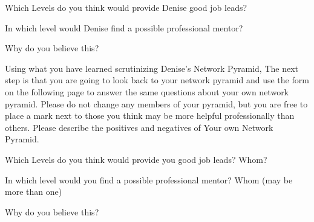 \hrulefill

\hrulefill

\hrulefill

\hrulefill

\hrulefill

\hrulefill

Which Levels do you think would provide Denise good job leads? 

\hrulefill

\hrulefill

In which level would Denise find a possible professional mentor? 

\hrulefill

\hrulefill

Why do you believe this?

\hrulefill

\hrulefill

\hrulefill

\hrulefill

Using what you have learned scrutinizing Denise's Network Pyramid, The next step is that you are going to look back to your network pyramid and use the form on the following page to answer the same questions about your own network pyramid. Please do not change any members of your pyramid, but you are free to place a mark next to those you think may be more helpful professionally than others. 
\clearpage
Please describe the positives and negatives of Your own Network Pyramid. 

\hrulefill

\hrulefill

\hrulefill

\hrulefill

\hrulefill

\hrulefill

Which Levels do you think would provide you good job leads? Whom?

\hrulefill

\hrulefill

\hrulefill

\hrulefill

In which level would you find a possible professional mentor?  Whom (may be more than one)

\hrulefill

\hrulefill

\hrulefill

\hrulefill

Why do you believe this?

\hrulefill

